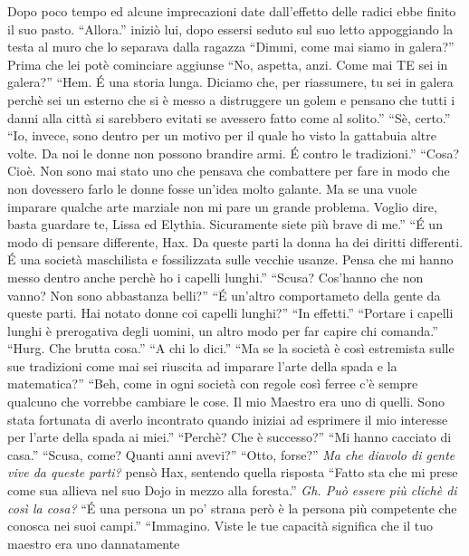     Dopo poco tempo ed alcune imprecazioni date dall'effetto delle radici
    ebbe finito il suo pasto. ``Allora.'' iniziò lui, dopo essersi seduto
    sul suo letto appoggiando la testa al muro che lo separava dalla
    ragazza ``Dimmi, come mai siamo in galera?'' Prima che lei potè
    cominciare aggiunse ``No, aspetta, anzi. Come mai TE sei in galera?''
    ``Hem. \'E una storia lunga. Diciamo che, per riassumere, tu sei in
    galera perchè sei un esterno che si è messo a distruggere un golem e
    pensano che tutti i danni alla città si sarebbero evitati se avessero
    fatto come al solito.'' ``Sè, certo.'' ``Io, invece, sono dentro per un
    motivo per il quale ho visto la gattabuia altre volte. Da noi le donne
    non possono brandire armi. \'E contro le tradizioni.'' ``Cosa? Cioè.
    Non sono mai stato uno che pensava che combattere per fare in modo che
    non dovessero farlo le donne fosse un'idea molto galante. Ma se una
    vuole imparare qualche arte marziale non mi pare un grande problema.
    Voglio dire, basta guardare te, Lissa ed Elythia. Sicuramente siete più
    brave di me.'' ``\'E un modo di pensare differente, Hax. Da queste
    parti la donna ha dei diritti differenti. \'E una società maschilista e
    fossilizzata sulle vecchie usanze. Pensa che mi hanno messo dentro
    anche perchè ho i capelli lunghi.'' ``Scusa? Cos'hanno che non vanno?
    Non sono abbastanza belli?'' ``\'E un'altro comportameto della gente da
    queste parti. Hai notato donne coi capelli lunghi?'' ``In effetti.''
    ``Portare i capelli lunghi è prerogativa degli uomini, un altro modo
    per far capire chi comanda.'' ``Hurg. Che brutta cosa.'' ``A chi lo
    dici.'' ``Ma se la società è così estremista sulle sue tradizioni come
    mai sei riuscita ad imparare l'arte della spada e la matematica?''
    ``Beh, come in ogni società con regole così ferree c'è sempre qualcuno
    che vorrebbe cambiare le cose. Il mio Maestro era uno di quelli. Sono
    stata fortunata di averlo incontrato quando iniziai ad esprimere il mio
    interesse per l'arte della spada ai miei.'' ``Perchè? Che è successo?''
    ``Mi hanno cacciato di casa.'' ``Scusa, come? Quanti anni avevi?''
    ``Otto, forse?'' \emph{Ma che diavolo di gente vive da queste parti?}
    pensò Hax, sentendo quella risposta ``Fatto sta che mi prese come sua
    allieva nel suo Dojo in mezzo alla foresta.'' \emph{Gh. Può essere
    più clichè di così la cosa?} ``\'E una persona un po' strana però è la
    persona più competente che conosca nei suoi campi.'' ``Immagino. Viste
    le tue capacità significa che il tuo maestro era uno dannatamente
